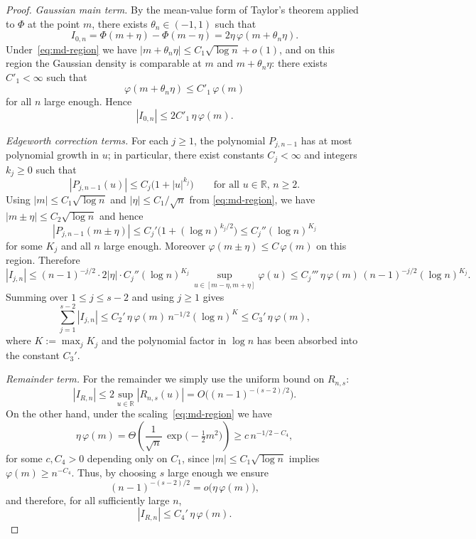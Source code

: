 \documentclass{article}
\theoremstyle{plain}
\theoremstyle{definition}
\begin{document}
\begin{proof}
\medskip\noindent
\textit{Gaussian main term.}
By the mean-value form of Taylor's theorem applied to $\Phi$ at the
point $m$, there exists $\theta_n\in(-1,1)$ such that
\[
  I_{0,n}
  = \Phi(m+\eta)-\Phi(m-\eta)
  = 2\eta\,\varphi(m+\theta_n\eta).
\]
Under~\eqref{eq:md-region} we have
$|m+\theta_n\eta|\le C_1\sqrt{\log n}+o(1)$, and on this region the
Gaussian density is comparable at $m$ and $m+\theta_n\eta$:
there exists $C'_1<\infty$ such that
\[
  \varphi(m+\theta_n\eta)
  \le C'_1\,\varphi(m)
\]
for all $n$ large enough.
Hence
\begin{equation}
  \label{eq:gauss-window-main}
  |I_{0,n}|
  \le 2C'_1\,\eta\,\varphi(m).
\end{equation}

\medskip\noindent
\textit{Edgeworth correction terms.}
For each $j\ge1$, the polynomial $P_{j,n-1}$ has at most polynomial
growth in $u$; in particular, there exist constants $C_j<\infty$ and
integers $k_j\ge0$ such that
\[
  |P_{j,n-1}(u)|
  \le C_j\bigl(1+|u|^{k_j}\bigr)
  \qquad\text{for all }u\in\mathbb R,\,n\ge2.
\]
Using $|m|\le C_1\sqrt{\log n}$ and $|\eta|\le C_1/\sqrt{n}$ from
\eqref{eq:md-region}, we have $|m\pm\eta|\le C_2\sqrt{\log n}$ and hence
\[
  |P_{j,n-1}(m\pm\eta)|
  \le C_j'\bigl(1+(\log n)^{k_j/2}\bigr)
  \le C_j''(\log n)^{K_j}
\]
for some $K_j$ and all $n$ large enough.
Moreover $\varphi(m\pm\eta)\le C\,\varphi(m)$ on this region.
Therefore
\[
  |I_{j,n}|
  \le (n-1)^{-j/2}\cdot 2|\eta|\cdot C_j''(\log n)^{K_j}\,\sup_{u\in[m-\eta,m+\eta]}\varphi(u)
  \le C_j'''\,\eta\,\varphi(m)\,(n-1)^{-j/2}(\log n)^{K_j}.
\]
Summing over $1\le j\le s-2$ and using $j\ge1$ gives
\begin{equation}
  \label{eq:gauss-window-edgeworth}
  \sum_{j=1}^{s-2}|I_{j,n}|
  \le C_2'\,\eta\,\varphi(m)\,n^{-1/2}(\log n)^{K}
  \le C_3'\,\eta\,\varphi(m),
\end{equation}
where $K:=\max_j K_j$ and the polynomial factor in $\log n$ has been
absorbed into the constant $C_3'$.

\medskip\noindent
\textit{Remainder term.}
For the remainder we simply use the uniform bound on $R_{n,s}$:
\[
  |I_{R,n}|
  \le 2\sup_{u\in\mathbb R}|R_{n,s}(u)|
  = O\bigl((n-1)^{-(s-2)/2}\bigr).
\]
On the other hand, under the scaling~\eqref{eq:md-region} we have
\[
  \eta\,\varphi(m)
  = \Theta\left(\frac{1}{\sqrt{n}}\,
         \exp\!\bigl(-\tfrac12 m^2\bigr)\right)
  \ge c\,n^{-1/2-C_4},
\]
for some $c,C_4>0$ depending only on $C_1$, since
$|m|\le C_1\sqrt{\log n}$ implies
$\varphi(m)\ge n^{-C_4}$.
Thus, by choosing $s$ large enough we ensure
\[
  (n-1)^{-(s-2)/2}
  = o\bigl(\eta\,\varphi(m)\bigr),
\]
and therefore, for all sufficiently large $n$,
\begin{equation}
  \label{eq:gauss-window-remainder}
  |I_{R,n}|
  \le C_4'\,\eta\,\varphi(m).
\end{equation}


\end{proof}
\end{document}
